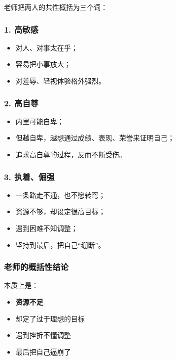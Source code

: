 \documentclass[
  chinese,
  9pt,
  a4paper,
]{ctexart}
\providecommand{\tightlist}{%
  \setlength{\itemsep}{0pt}\setlength{\parskip}{0pt}}
\begin{document}
老师把两人的共性概括为三个词：

\subsubsection{1. 高敏感}\label{ux9ad8ux654fux611f}

\begin{itemize}
\tightlist
\item
  对人、对事太在乎；
\item
  容易把小事放大；
\item
  对羞辱、轻视体验格外强烈。
\end{itemize}

\subsubsection{2. 高自尊}\label{ux9ad8ux81eaux5c0a}

\begin{itemize}
\tightlist
\item
  内里可能自卑；
\item
  但越自卑，越想通过成绩、表现、荣誉来证明自己；
\item
  追求高自尊的过程，反而不断受伤。
\end{itemize}

\subsubsection{3. 执着、倔强}\label{ux6267ux7740ux5014ux5f3a}

\begin{itemize}
\tightlist
\item
  一条路走不通，也不愿转弯；
\item
  资源不够，却设定很高目标；
\item
  遇到困难不知调整；
\item
  坚持到最后，把自己``绷断''。
\end{itemize}

\subsubsection{老师的概括性结论}\label{ux8001ux5e08ux7684ux6982ux62ecux6027ux7ed3ux8bba}

本质上是：

\begin{itemize}
\tightlist
\item
  \textbf{资源不足}
\item
  却定了过于理想的目标
\item
  遇到挫折不懂调整
\item
  最后把自己逼崩了
\end{itemize}
\end{document}
